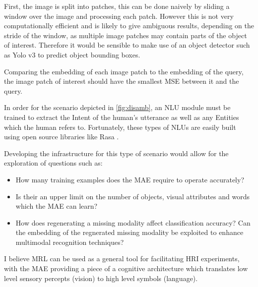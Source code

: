 First, the image is split into patches, this can be done naively by sliding a window over the image and processing each patch. However this is not very computationally efficient and is likely to give ambiguous results, depending on the stride of the window, as multiple image patches may contain parts of the object of interest. Therefore it would be sensible to make use of an object detector such as Yolo v3 \cite{redmon2018yolov3} to predict object bounding boxes.

Comparing the embedding of each image patch to the embedding of the query, the image patch of interest should have the smallest \ac{MSE} between it and the query.

In order for the scenario depicted in \ref{fig:disamb}, an \ac{NLU} module must be trained to extract the Intent of the human's utterance as well as any Entities which the human refers to. Fortunately, these types of \acp{NLU} are easily built using open source libraries like Rasa \cite{rasa}.



Developing the infrastructure for this type of scenario would allow for the exploration of questions such as:

\begin{itemize}
\item How many training examples does the \ac{MAE} require to operate accurately?
\item Is their an upper limit on the number of objects, visual attributes and words which the \ac{MAE} can learn?
\item How does regenerating a missing modality affect classification accuracy? Can the embedding of the regnerated missing modality be exploited to enhance  multimodal recognition techniques?
\end{itemize}

I believe \ac{MRL} can be used as a general tool for facilitating \ac{HRI} experiments, with the \ac{MAE} providing a piece of a cognitive architecture which translates low level sensory percepts (vision) to high level symbols (language).




